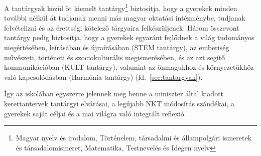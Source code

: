 A tantárgyak közül öt kiemelt tantárgy\footnote{Magyar nyelv és irodalom, Történelem, társadalmi és állampolgári ismeretek és társadalomismeret, Matematika, Testnevelés és Idegen nyelv} biztosítja, hogy a gyerekek minden további nélkül át tudjanak menni más magyar oktatási intézménybe, tudjanak felvételizni és az érettségi kötelező tárgyaira felkészüljenek. Három összevont tantárgy pedig biztosítja, hogy a gyerekek egyaránt fejlődnek a világ tudományos megértésében, leírásában és újraírásában (STEM tantárgy), az emberiség művészeti, történeti és szociokulturális megismerésében, és az azt segítő kommunikáció\-ban (KULT tantárgy), valamint az önmagukhoz és környezetükhöz való kapcsolódásban (Harmónia tantárgy) 
(ld.~\ref{sec:tantargyak}).

Így az iskolában egyszerre jelennek meg benne a miniszter által kiadott kerettantervek tantárgyi elvárásai, a legújabb NKT módosítás szándékai, a gyerekek saját céljai és a mai világra való integrált reflexió. 

